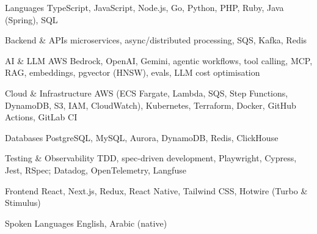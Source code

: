 

\begin{cvskills}

  \cvskill
    {Languages} %
    {TypeScript, JavaScript, Node.js, Go, Python, PHP, Ruby, Java (Spring), SQL} %

  \cvskill
    {Backend \& APIs} %
    {microservices, async/distributed processing, SQS, Kafka, Redis} %

  \cvskill
    {AI \& LLM} %
    {AWS Bedrock, OpenAI, Gemini, agentic workflows, tool calling, MCP, RAG, embeddings, pgvector (HNSW), evals, LLM cost optimisation} %

  \cvskill
    {Cloud \& Infrastructure} %
    {AWS (ECS Fargate, Lambda, SQS, Step Functions, DynamoDB, S3, IAM, CloudWatch), Kubernetes, Terraform, Docker, GitHub Actions, GitLab CI} %

  \cvskill
    {Databases} %
    {PostgreSQL, MySQL, Aurora, DynamoDB, Redis, ClickHouse} %

  \cvskill
    {Testing \& Observability} %
    {TDD, spec-driven development, Playwright, Cypress, Jest, RSpec; Datadog, OpenTelemetry, Langfuse} %

  \cvskill
    {Frontend} %
    {React, Next.js, Redux, React Native, Tailwind CSS, Hotwire (Turbo \& Stimulus)} %

  \cvskill
    {Spoken Languages} %
    {English, Arabic (native)} %

\end{cvskills}
